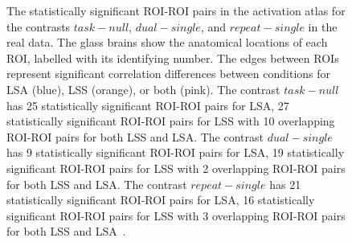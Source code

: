 \documentclass[10pt,letterpaper]{article}
\begin{document}
\vspace*{0.2in}

\begin{flushleft}
{\Large
\textbf{} %
}
\newline
\end{flushleft}

\linenumbers
\begin{figure}[H]
    \centering



    \caption{
     The statistically significant ROI-ROI pairs in the activation atlas for the contrasts $task - null$, $dual - single$,
     and $repeat - single$ in the real data.
     The glass brains show the anatomical locations of each ROI,
     labelled with its identifying number.
     The edges between ROIs represent significant correlation differences
     between conditions for LSA (blue), LSS (orange), or both (pink).
     The contrast $task - null$ has 25 statistically significant ROI-ROI
     pairs for LSA, 27 statistically significant ROI-ROI pairs
     for LSS with 10 overlapping ROI-ROI pairs for both LSS and LSA.
     The contrast $dual - single$ has 9 statistically significant ROI-ROI
     pairs for LSA, 19 statistically significant ROI-ROI pairs
     for LSS with 2 overlapping ROI-ROI pairs for both LSS and LSA.
     The contrast $repeat - single$ has 21 statistically significant ROI-ROI
     pairs for LSA, 16 statistically significant ROI-ROI pairs
     for LSS with 3 overlapping ROI-ROI pairs for both LSS and LSA~\cite{Abdulrahman2016}.
    }
    \label{fig:significant-contrasts}
  \end{figure}
\end{document}

